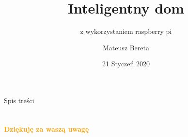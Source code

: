 \documentclass[aspectratio=43]{beamer}
\title{Inteligentny dom }
\subtitle{z wykorzystaniem raspberry pi}
\author[ID. A006 Mateusz Bereta]{Mateusz Bereta}
\institute[MS]{
    Politechnika Śląska%
}
\date{21 Styczeń 2020}
\begin{document}
    
    \frame{\titlepage}
    
    \begin{frame}{Spis treści}
        \tableofcontents
    \end{frame}
    
    
    
    
     
    
    

    \section{}
    
    \begin{frame}{}
        \centering
            \Huge\bfseries
        \textcolor{orange}{Dziękuję za waszą uwagę}
        \pagestyle{empty}
    \end{frame}
\end{document}
